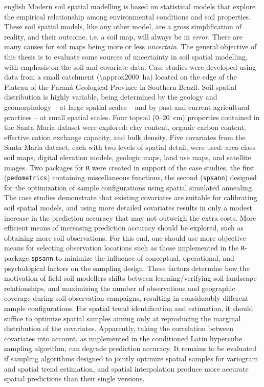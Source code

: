 \documentclass[tese]{UFRuralRJ}
\newcommand{\Rpackage}[1]{\texttt{R}-package \texttt{#1}} %
\begin{document}
\generalabstracttrue
\begin{generalabstract}{english}{\titleEn}{\keyEn}
Modern soil spatial modelling is based on statistical models that explore the empirical relationship among 
environmental conditions and soil properties. These soil spatial models, like any other model, are a gross 
simplification of reality, and their outcome, i.e. a soil map, will always be in \emph{error}. There are many 
causes for soil maps being more or less \emph{uncertain}. The general objective of this thesis is to evaluate 
some sources of uncertainty in soil spatial modelling, with emphasis on the soil and covariate data. Case 
studies were developed using data from a small catchment (\SI{\approx2000}{\hectare}) located on the edge
of the Plateau of the Paraná Geological Province in Southern Brazil. Soil spatial distribution is highly 
variable, being determined by the geology and geomorphology -- at large spatial scales -- and by past and 
current agricultural practices -- at small spatial scales. Four topsoil (0--\SI{20}{\cm}) properties contained 
in the Santa Maria dataset were explored: clay content, organic carbon content, effective cation exchange 
capacity, and bulk density. Five covariates from the Santa Maria dataset, each with two levels of spatial 
detail, were used: area-class soil maps, digital elevation models, geologic maps, land use maps, and satellite 
images. Two packages for \texttt{R} were created in support of the case studies, the first 
(\texttt{pedometrics}) 
containing miscellaneous functions, the second (\texttt{spsann}) designed for the optimization of sample 
configurations using spatial simulated annealing. The case studies demonstrate that existing covariates are 
suitable 
for calibrating soil spatial models, and using more detailed covariates results in only a modest increase in 
the 
prediction accuracy that may not outweigh the extra costs. More efficient means of increasing prediction 
accuracy should be explored, such as obtaining more soil observations. For this end, one should use more 
objective means for selecting observation locations such as those implemented in the \Rpackage{spsann} 
to minimize the influence of conceptual, operational, and psychological factors on the sampling design. These 
factors determine how the motivation of field soil modellers shifts between learning/verifying soil-landscape 
relationships, and maximizing the number of observations and geographic coverage during soil observation 
campaigns, resulting in considerably different sample configurations. For spatial trend identification and 
estimation, it should suffice to optimize spatial samples aiming only at reproducing the marginal distribution 
of the covariates. Apparently, taking the correlation between covariates into account, as implemented in 
the conditioned Latin hypercube sampling algorithm, can degrade prediction accuracy. It remains to be 
evaluated 
if sampling algorithms designed to jointly optimize spatial samples for variogram and spatial trend 
estimation, 
and spatial interpolation produce more accurate spatial predictions than their single versions.
\end{generalabstract}
\end{document}
